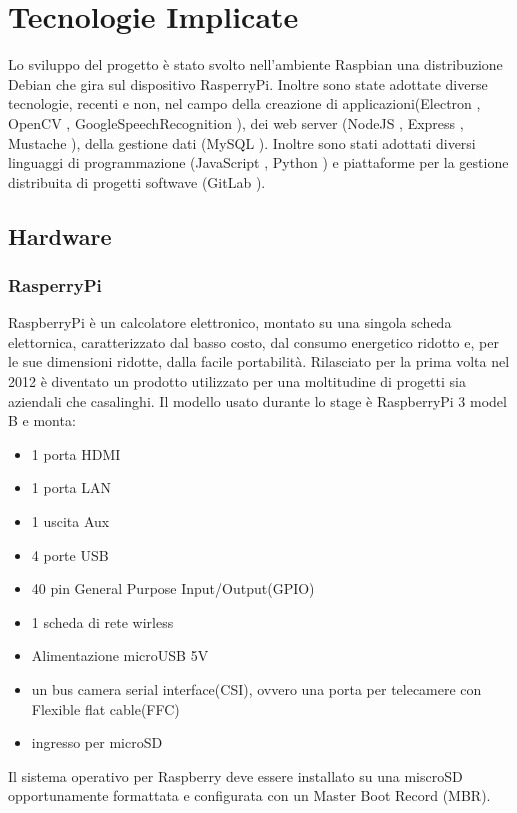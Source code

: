 \chapter{Tecnologie Implicate}

Lo sviluppo del progetto \`e stato svolto nell'ambiente Raspbian\cite{Raspbian}
una distribuzione Debian\cite{Debian} che gira sul dispositivo RasperryPi\cite{Raspberry}.
Inoltre sono state adottate diverse tecnologie, recenti
e non, nel campo della creazione di applicazioni(Electron \cite{Electron-website},
OpenCV \cite{OpenCV-website}, GoogleSpeechRecognition \cite{GoogleSTT-website}),
dei web server (NodeJS \cite{NodeJS-website}, Express \cite{Express-website}, Mustache \cite{Mustache}),
della gestione dati (MySQL \cite{MySQL}).
Inoltre sono stati adottati diversi linguaggi di programmazione (JavaScript \cite{JavaScript}, Python \cite{Python})
e piattaforme per la gestione distribuita di progetti softwave (GitLab \cite{git-website}).

\section{Hardware}
\subsection{RasperryPi}
RaspberryPi \`e un calcolatore elettronico, montato su una singola scheda elettornica,
caratterizzato dal basso costo, dal consumo energetico ridotto e, per le sue
dimensioni ridotte, dalla facile portabilit\`a.
Rilasciato per la prima volta nel 2012 \`e diventato un prodotto utilizzato per una moltitudine
di progetti sia aziendali che casalinghi.
Il modello usato durante lo stage \`e RaspberryPi 3 model B e monta:
\begin{itemize}
\item 1 porta HDMI
\item 1 porta LAN
\item 1 uscita Aux
\item 4 porte USB
\item 40 pin General Purpose Input/Output(GPIO)
\item 1 scheda di rete wirless
\item Alimentazione microUSB 5V
\item un bus camera serial interface(CSI), ovvero una porta per telecamere con Flexible flat cable(FFC)
\item ingresso per microSD
\end{itemize}
Il sistema operativo per Raspberry deve essere installato su una miscroSD opportunamente formattata
e configurata con un Master Boot Record (MBR).

